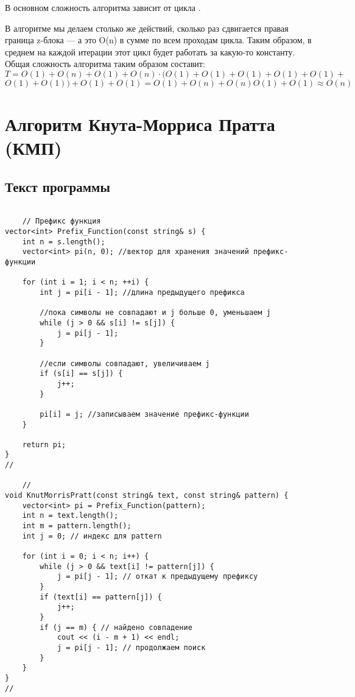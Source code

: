 \documentclass[bachelor, och, referat, times]{SCWorks}
\begin{document}
В основном сложность алгоритма зависит от цикла . 

В алгоритме мы делаем столько же действий, сколько раз сдвигается правая граница z-блока
— а это O(n) в сумме по всем проходам цикла. Таким образом, 
в среднем на каждой итерации этот цикл будет работать за какую-то константу.
Общая сложность алгоритма таким образом составит:
$T = O(1) + O(n) + O(1) + O(n) · (O(1) + O(1) + O(1) + O(1) + O(1) +$
$O(1) + O(1)) + O(1) + O(1) = O(1) + O(n) + O(n)O(1) + O(1) \approx  O(n)$

\section{Алгоритм Кнута-Морриса Пратта (КМП)}

\subsection{Текст программы}
\begin{verbatim}

    // Префикс функция
vector<int> Prefix_Function(const string& s) {
    int n = s.length();
    vector<int> pi(n, 0); //вектор для хранения значений префикс-функции

    for (int i = 1; i < n; ++i) {
        int j = pi[i - 1]; //длина предыдущего префикса

        //пока символы не совпадают и j больше 0, уменьшаем j
        while (j > 0 && s[i] != s[j]) {
            j = pi[j - 1];
        }

        //если символы совпадают, увеличиваем j
        if (s[i] == s[j]) {
            j++;
        }

        pi[i] = j; //записываем значение префикс-функции
    }

    return pi;
}
//

    //
void KnutMorrisPratt(const string& text, const string& pattern) {
    vector<int> pi = Prefix_Function(pattern);
    int n = text.length();
    int m = pattern.length();
    int j = 0; // индекс для pattern

    for (int i = 0; i < n; i++) {
        while (j > 0 && text[i] != pattern[j]) {
            j = pi[j - 1]; // откат к предыдущему префиксу
        }
        if (text[i] == pattern[j]) {
            j++;
        }
        if (j == m) { // найдено совпадение
            cout << (i - m + 1) << endl;
            j = pi[j - 1]; // продолжаем поиск
        }
    }
}
//
\end{verbatim}
\end{document}
